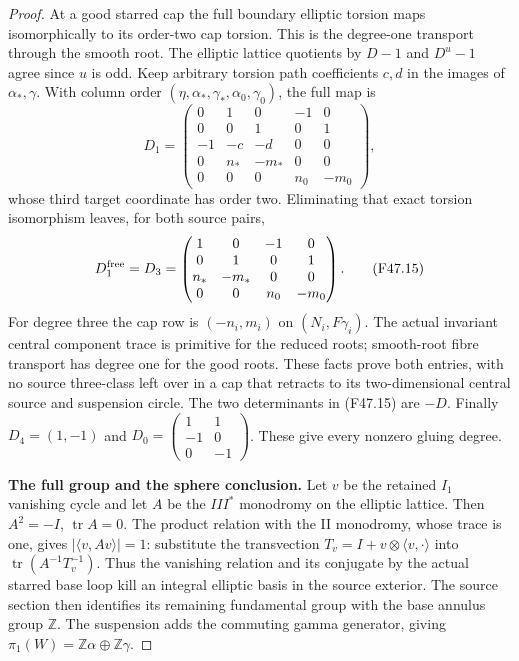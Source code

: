 \begin{proof}
At a good starred cap the full boundary elliptic torsion maps
isomorphically to its order-two cap torsion. This is the
degree-one transport through the smooth root. The elliptic
lattice quotients by $D-1$ and $D^u-1$ agree since $u$ is odd.
Keep arbitrary torsion path coefficients $c,d$ in the images
of $\alpha_*,\gamma$. With column order
$(\eta,\alpha_*,\gamma_*,\alpha_0,\gamma_0)$, the full map is
\[
 D_1=\begin{pmatrix}
 0&1&0&-1&0\\0&0&1&0&1\\-1&-c&-d&0&0\\
 0&n_*&-m_*&0&0\\0&0&0&n_0&-m_0
 \end{pmatrix},                                      \tag{F47.14}
\]
whose third target coordinate has order two. Eliminating that
exact torsion isomorphism leaves, for both source pairs,
\[
 D_1^{\rm free}=D_3=
 \begin{pmatrix}
 1&0&-1&0\\0&1&0&1\\n_*&-m_*&0&0\\0&0&n_0&-m_0
 \end{pmatrix}.                                      \tag{F47.15}
\]
For degree three the cap row is $(-n_i,m_i)$ on $(N_i,F\gamma_i)$.
The actual invariant central component trace is primitive for
the reduced roots; smooth-root fibre transport has degree one
for the good roots. These facts prove both entries, with no
source three-class left over in a cap that retracts to its
two-dimensional central source and suspension circle.
The two determinants in (F47.15) are $-D$.
Finally $D_4=(1,-1)$ and
$D_0=\left(\begin{smallmatrix}1&1\\-1&0\\0&-1\end{smallmatrix}\right)$.
These give every nonzero gluing degree.

\par\medskip\noindent\textbf{The full group and the sphere conclusion.}\enspace
Let $v$ be the retained $I_1$ vanishing cycle and let $A$ be
the $III^*$ monodromy on the elliptic lattice. Then
$A^2=-I$, $\operatorname{tr}A=0$. The product relation with
the II monodromy, whose trace is one, gives
$|\langle v,Av\rangle|=1$: substitute the transvection
$T_v=I+v\otimes\langle v,\cdot\rangle$ into
$\operatorname{tr}(A^{-1}T_v^{-1})$.
Thus the vanishing relation and its conjugate by the actual
starred base loop kill an integral elliptic basis in the source
exterior. The source section then identifies its remaining
fundamental group with the base annulus group $\mathbb Z$.
The suspension adds the commuting gamma generator, giving
$\pi_1(W)=\mathbb Z\alpha\oplus\mathbb Z\gamma$.


\end{proof}
